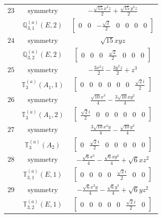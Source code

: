 \documentclass[fleqn,8pt,landscape]{jsarticle}
\begin{document}
\begin{longtable}{ccc}
$ 23 $ & $ \text{symmetry} $ & $ - \frac{\sqrt{15} x^{2} z}{2} + \frac{\sqrt{15} y^{2} z}{2} $ \\
$  $ & $ \mathbb{Q}_{3,1}^{(a)}(E,2) $ & $ \begin{bmatrix} 0 & 0 & - \frac{\sqrt{2}}{2} & 0 & 0 & 0 & 0 \end{bmatrix} $ \\ \hline
$ 24 $ & $ \text{symmetry} $ & $ \sqrt{15} x y z $ \\
$  $ & $ \mathbb{Q}_{3,2}^{(a)}(E,2) $ & $ \begin{bmatrix} 0 & 0 & 0 & \frac{\sqrt{2}}{2} & 0 & 0 & 0 \end{bmatrix} $ \\ \hline
$ 25 $ & $ \text{symmetry} $ & $ - \frac{3 x^{2} z}{2} - \frac{3 y^{2} z}{2} + z^{3} $ \\
$  $ & $ \mathbb{T}_{3}^{(a)}(A_{1},1) $ & $ \begin{bmatrix} 0 & 0 & 0 & 0 & 0 & 0 & \frac{\sqrt{2} i}{2} \end{bmatrix} $ \\ \hline
$ 26 $ & $ \text{symmetry} $ & $ \frac{\sqrt{10} x^{3}}{4} - \frac{3 \sqrt{10} x y^{2}}{4} $ \\
$  $ & $ \mathbb{T}_{3}^{(a)}(A_{1},2) $ & $ \begin{bmatrix} \frac{\sqrt{2} i}{2} & 0 & 0 & 0 & 0 & 0 & 0 \end{bmatrix} $ \\ \hline
$ 27 $ & $ \text{symmetry} $ & $ \frac{3 \sqrt{10} x^{2} y}{4} - \frac{\sqrt{10} y^{3}}{4} $ \\
$  $ & $ \mathbb{T}_{3}^{(a)}(A_{2}) $ & $ \begin{bmatrix} 0 & \frac{\sqrt{2} i}{2} & 0 & 0 & 0 & 0 & 0 \end{bmatrix} $ \\ \hline
$ 28 $ & $ \text{symmetry} $ & $ - \frac{\sqrt{6} x^{3}}{4} - \frac{\sqrt{6} x y^{2}}{4} + \sqrt{6} x z^{2} $ \\
$  $ & $ \mathbb{T}_{3,1}^{(a)}(E,1) $ & $ \begin{bmatrix} 0 & 0 & 0 & 0 & \frac{\sqrt{2} i}{2} & 0 & 0 \end{bmatrix} $ \\ \hline
$ 29 $ & $ \text{symmetry} $ & $ - \frac{\sqrt{6} x^{2} y}{4} - \frac{\sqrt{6} y^{3}}{4} + \sqrt{6} y z^{2} $ \\
$  $ & $ \mathbb{T}_{3,2}^{(a)}(E,1) $ & $ \begin{bmatrix} 0 & 0 & 0 & 0 & 0 & \frac{\sqrt{2} i}{2} & 0 \end{bmatrix} $ \\ \hline

\end{longtable}
\end{document}
